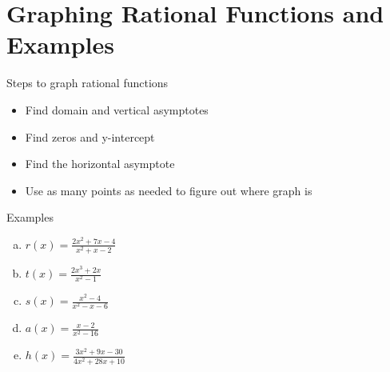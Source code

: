 \documentclass{tufte-handout}
\begin{document}
\section{Graphing Rational Functions and Examples}
Steps to graph rational functions
\begin{itemize}
\item Find domain and vertical asymptotes
\item Find zeros and y-intercept
\item Find the horizontal asymptote
\item Use as many points as needed to figure out where graph is
\end{itemize}

Examples
\begin{multicols}{2}
\begin{enumerate}[(a)]
\item $r(x) = \frac{2x^2+7x-4}{x^2+x-2}$
\item $t(x) = \frac{2x^3+2x}{x^2-1}$
\item $s(x) = \frac{x^2-4}{x^2-x-6}$
\item $a(x) = \frac{x-2}{x^2-16}$
\item $h(x) = \frac{3x^2+9x-30}{4x^2+28x+10}$
\end{enumerate}
\end{multicols}
\end{document}
